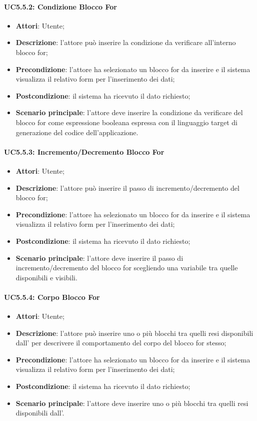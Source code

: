 \paragraph{UC5.5.2: Condizione Blocco For}
\label{UC5.5.2}
\begin{itemize}
\item \textbf{Attori}: Utente;
\item \textbf{Descrizione}: l'attore può inserire la condizione da verificare all'interno blocco for;	
\item \textbf{Precondizione}:  l'attore ha selezionato un blocco for da inserire e il sistema visualizza il relativo form per l'inserimento dei dati;	
\item \textbf{Postcondizione}: il sistema ha ricevuto il dato richiesto;	
\item \textbf{Scenario principale}:
l'attore deve inserire la condizione da verificare del blocco for come espressione booleana espressa con il linguaggio target di generazione del codice dell'applicazione.	
\end{itemize}

\paragraph{UC5.5.3: Incremento/Decremento Blocco For}
\label{UC5.5.3}
\begin{itemize}
\item \textbf{Attori}: Utente;
\item \textbf{Descrizione}: l'attore può inserire il passo di incremento/decremento del blocco for;	
\item \textbf{Precondizione}: l'attore ha selezionato un blocco for da inserire e il sistema visualizza il relativo form per l'inserimento dei dati;	
\item \textbf{Postcondizione}: il sistema ha ricevuto il dato richiesto;	
\item \textbf{Scenario principale}:
l'attore deve inserire il passo di incremento/decremento del blocco for scegliendo una variabile tra quelle disponibili e visibili.	
\end{itemize}

\paragraph{UC5.5.4: Corpo Blocco For}
\label{UC5.5.4}
\begin{itemize}
\item \textbf{Attori}: Utente;
\item \textbf{Descrizione}: l'attore può inserire uno o più blocchi tra quelli resi disponibili dall' per descrivere il comportamento del corpo del blocco for stesso;	
\item \textbf{Precondizione}: l'attore ha selezionato un blocco for da inserire e il sistema visualizza il relativo form per l'inserimento dei dati;	
\item \textbf{Postcondizione}: il sistema ha ricevuto il dato richiesto;	
\item \textbf{Scenario principale}:
l'attore deve inserire uno o più blocchi tra quelli resi disponibili dall'.	
\end{itemize}


